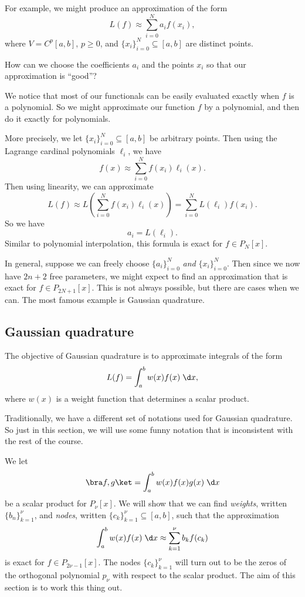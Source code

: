 \documentclass[a4paper]{article}
\begin{document}
For example, we might produce an approximation of the form
\[
  L(f) \approx \sum_{i = 0}^N a_i f(x_i),
\]
where $V = C^p[a, b]$, $p \geq 0$, and $\{x_i\}_{i = 0}^N \subseteq [a, b]$ are distinct points.

How can we choose the coefficients $a_i$ and the points $x_i$ so that our approximation is ``good''?

We notice that most of our functionals can be easily evaluated exactly when $f$ is a polynomial. So we might approximate our function $f$ by a polynomial, and then do it exactly for polynomials.

More precisely, we let $ \{x_i\}_{i = 0}^N \subseteq [a, b]$ be arbitrary points. Then using the Lagrange cardinal polynomials $\ell_i$, we have
\[
  f(x) \approx \sum_{i = 0}^N f(x_i) \ell_i(x).
\]
Then using linearity, we can approximate
\[
  L(f) \approx L\left(\sum_{i = 0}^N f(x_i) \ell_i(x)\right) = \sum_{i = 0}^N L(\ell_i) f(x_i).
\]
So we have
\[
  a_i = L(\ell_i).
\]
Similar to polynomial interpolation, this formula is exact for $f \in P_N[x]$.

In general, suppose we can freely choose $\{a_i\}_{i = 0}^N$ \emph{and} $\{x_i\}_{i = 0}^N$. Then since we now have $2n + 2$ free parameters, we might expect to find an approximation that is exact for $f \in P_{2N + 1}[x]$. This is not always possible, but there are cases when we can. The most famous example is Gaussian quadrature.

\subsection{Gaussian quadrature}
The objective of Gaussian quadrature is to approximate integrals of the form
\[
  L(f) = \int_a^b w(x) f(x)\;\d x,
\]
where $w(x)$ is a weight function that determines a scalar product.

Traditionally, we have a different set of notations used for Gaussian quadrature. So just in this section, we will use some funny notation that is inconsistent with the rest of the course.

We let
\[
  \bra f, g\ket = \int_a^b w(x) f(x)g(x)\;\d x
\]
be a scalar product for $P_\nu[x]$. We will show that we can find \emph{weights}, written $\{b_n\}_{k = 1}^\nu$, and \emph{nodes}, written $\{c_k\}_{k = 1}^\nu \subseteq [a, b]$, such that the approximation
\[
  \int_a^b w(x) f(x)\;\d x \approx \sum_{k = 1}^{\nu} b_k f(c_k)
\]
is exact for $f \in P_{2\nu - 1}[x]$. The nodes $\{c_k\}_{k = 1}^{\nu}$ will turn out to be the zeros of the orthogonal polynomial $p_\nu$ with respect to the scalar product. The aim of this section is to work this thing out.
\end{document}
